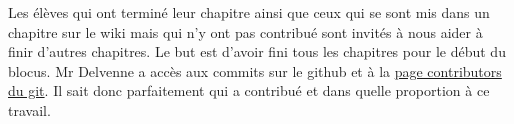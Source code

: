 Les élèves qui ont terminé leur chapitre ainsi que ceux qui se sont mis dans un chapitre sur le wiki mais qui n'y ont pas contribué sont invités à nous aider à finir d'autres chapitres. Le but est d'avoir fini tous les chapitres pour le début du blocus. Mr Delvenne a accès aux commits sur le github et à la \href{https://github.com/blegat/LINMA1691/graphs/contributors}{page contributors du git}. Il sait donc parfaitement qui a contribué et dans quelle proportion à ce travail.

\clearpage
\printindex

